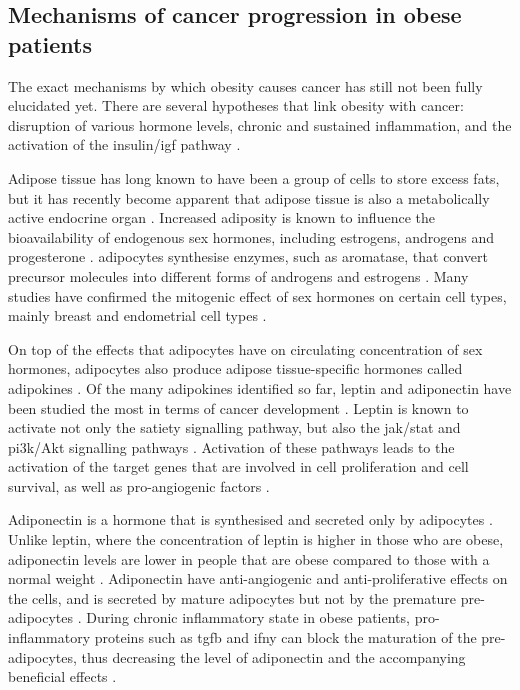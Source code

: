 \subsection{Mechanisms of cancer progression in obese patients}
\label{sub:mechanisms_of_cancer_progression_in_obese_patient}

The exact mechanisms by which obesity causes cancer has still not been fully elucidated yet.
There are several hypotheses that link obesity with cancer: disruption of various hormone levels, chronic and sustained inflammation, and the activation of the insulin/\gls{igf} pathway \citep{Lumeng2011,Roberts2010}.

Adipose tissue has long known to have been a group of cells to store excess fats, but it has recently become apparent that adipose tissue is also a metabolically active endocrine organ \citep{Roberts2010}.
Increased adiposity is known to influence the bioavailability of endogenous sex hormones, including estrogens, androgens and progesterone \citep{Calle2004}.
\Glspl{adipocyte} synthesise enzymes, such as aromatase, that convert precursor molecules into different forms of androgens and estrogens \citep{Calle2004}.
Many studies have confirmed the mitogenic effect of sex hormones on certain cell types, mainly breast and endometrial cell types \citep{Roberts2010}.

On top of the effects that \glspl{adipocyte} have on circulating concentration of sex hormones, \glspl{adipocyte} also produce adipose tissue-specific hormones called adipokines \citep{Roberts2010}.
Of the many adipokines identified so far, leptin and adipo\-nectin have been studied the most in terms of cancer development \citep{Renehan2006,Roberts2010}.
Leptin is known to activate not only the satiety signalling pathway, but also the \gls{jak}/\gls{stat} and \gls{pi3k}/Akt signalling pathways \citep{Garofalo2006,Renehan2006}.
Activation of these pathways leads to the activation of the target genes that are involved in cell proliferation and cell survival, as well as pro-angiogenic factors \citep{Garofalo2006}.

Adiponectin is a hormone that is synthesised and secreted only by \glspl{adipocyte} \citep{Kelesidis2006}.
Unlike leptin, where the concentration of leptin is higher in those who are obese, adiponectin levels are lower in people that are obese compared to those with a normal weight \citep{Kelesidis2006,Renehan2006}.
Adiponectin have anti-angiogenic and anti-proliferative effects on the cells, and is secreted by mature \glspl{adipocyte} but not by the premature pre-adipocytes \citep{Gilbert2013}.
During chronic inflammatory state in obese patients, pro-inflammatory proteins such as \gls{tgfb} and \gls{ifny} can block the maturation of the pre-adipocytes, thus decreasing the level of adiponectin and the accompanying beneficial effects \citep{Gilbert2013}.

